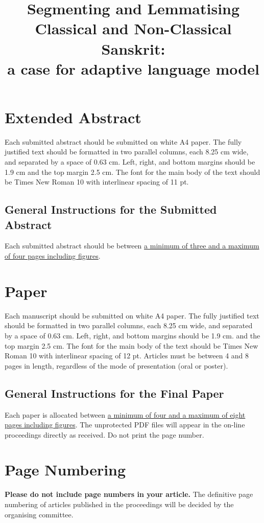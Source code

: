 \documentclass[10pt, a4paper]{article}
\title{\textbf{Segmenting and Lemmatising Classical and Non-Classical Sanskrit: \\ a case for adaptive language model}}}
\begin{document}
\maketitleabstract

\section{Extended Abstract}

Each submitted abstract should be submitted on white A4 paper. The fully
justified text should be formatted in two parallel columns, each 8.25 cm wide,
and separated by a space of 0.63 cm. Left, right, and bottom margins should be
1.9 cm and the top margin 2.5 cm. The font for the main body of the text should
be Times New Roman 10 with interlinear spacing of 11 pt.

\subsection{General Instructions for the Submitted Abstract}

Each submitted abstract should be between \ul{a minimum of three and
a maximum of four pages including figures}.

\section{Paper}

Each manuscript should be submitted on white A4 paper. The fully
justified text should be formatted in two parallel columns, each 8.25 cm wide,
and separated by a space of 0.63 cm. Left, right, and bottom margins should be
1.9 cm. and the top margin 2.5 cm. The font for the main body of the text should
be Times New Roman 10 with interlinear spacing of 12 pt.  Articles must be
between 4 and 8 pages in length, regardless of the mode of presentation (oral
or poster).

\subsection{General Instructions for the Final Paper}

Each paper is allocated between \ul{a minimum of four and a maximum of
eight pages including figures}. The unprotected PDF files will appear in the
on-line proceedings directly as received. Do not print the page number.

\section{Page Numbering}

\textbf{Please do not include page numbers in your article.} The definitive page
numbering of articles published in the proceedings will be decided by the
organising committee.
\end{document}
